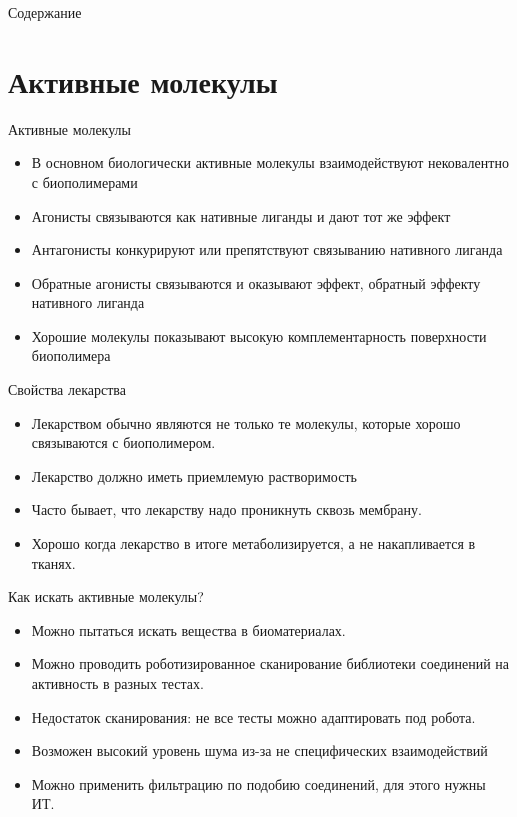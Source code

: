 
\begin{frame}[plain]
  \titlepage
\end{frame}

\begin{frame}{Содержание}
  \tableofcontents
\end{frame}
\section{Активные молекулы}

\begin{frame}{Активные молекулы}{}
 \begin{itemize}
	\item В основном биологически активные молекулы взаимодействуют нековалентно с биополимерами
	\item Агонисты связываются как нативные лиганды и дают тот же эффект
	\item Антагонисты конкурируют или препятствуют связыванию нативного лиганда
	\item Обратные агонисты связываются и оказывают эффект, обратный эффекту нативного лиганда
	\item Хорошие молекулы показывают высокую комплементарность поверхности биополимера
 \end{itemize}
\end{frame}


\begin{frame}{Свойства лекарства}{}
 \begin{itemize}
\item     Лекарством обычно являются не только те молекулы, которые хорошо связываются с биополимером.
\item	  Лекарство должно иметь приемлемую растворимость
\item	  Часто бывает, что лекарству надо проникнуть сквозь мембрану.
\item	  Хорошо когда лекарство в итоге метаболизируется, а не накапливается в тканях.
	\end{itemize}
\end{frame}

\begin{frame}{Как искать активные молекулы?}
	\begin{itemize}
		\item	Можно пытаться искать вещества в биоматериалах. 
		\item	Можно проводить роботизированное сканирование библиотеки соединений на активность в разных тестах. 
		\item Недостаток сканирования: не все тесты можно адаптировать под робота.
		\item   Возможен высокий уровень шума из-за не специфических взаимодействий
		\item    Можно применить фильтрацию по подобию соединений, для этого нужны ИТ.
		\end{itemize}
	\end{frame}

